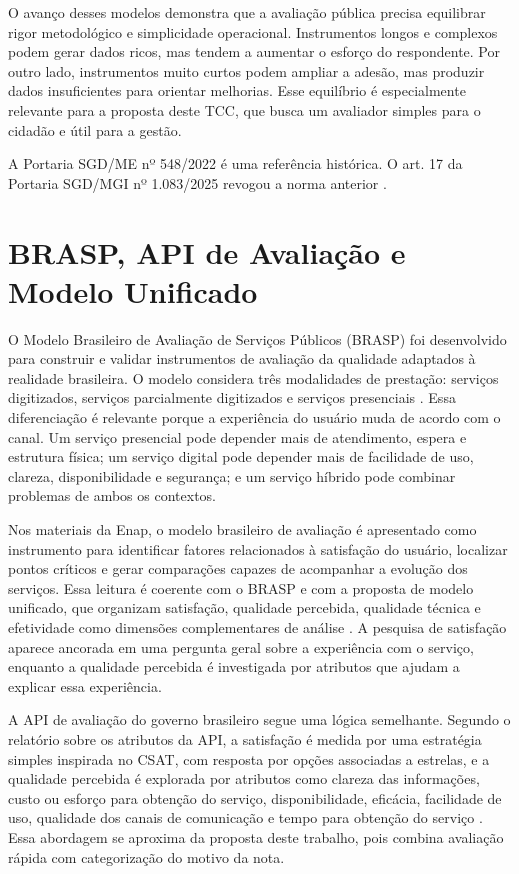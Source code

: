 O avanço desses modelos demonstra que a avaliação pública precisa equilibrar rigor metodológico e simplicidade operacional. Instrumentos longos e complexos podem gerar dados ricos, mas tendem a aumentar o esforço do respondente. Por outro lado, instrumentos muito curtos podem ampliar a adesão, mas produzir dados insuficientes para orientar melhorias. Esse equilíbrio é especialmente relevante para a proposta deste TCC, que busca um avaliador simples para o cidadão e útil para a gestão.

A Portaria SGD/ME nº 548/2022 é uma referência histórica. O art. 17 da Portaria SGD/MGI nº 1.083/2025 revogou a norma anterior \cite{sgd2025}.

\section{BRASP, API de Avaliação e Modelo Unificado}
\label{sec:2.6}

O Modelo Brasileiro de Avaliação de Serviços Públicos (BRASP) foi desenvolvido para construir e validar instrumentos de avaliação da qualidade adaptados à realidade brasileira. O modelo considera três modalidades de prestação: serviços digitizados, serviços parcialmente digitizados e serviços presenciais \cite{silva2019}. Essa diferenciação é relevante porque a experiência do usuário muda de acordo com o canal. Um serviço presencial pode depender mais de atendimento, espera e estrutura física; um serviço digital pode depender mais de facilidade de uso, clareza, disponibilidade e segurança; e um serviço híbrido pode combinar problemas de ambos os contextos.

Nos materiais da Enap, o modelo brasileiro de avaliação é apresentado como instrumento para identificar fatores relacionados à satisfação do usuário, localizar pontos críticos e gerar comparações capazes de acompanhar a evolução dos serviços. Essa leitura é coerente com o BRASP e com a proposta de modelo unificado, que organizam satisfação, qualidade percebida, qualidade técnica e efetividade como dimensões complementares de análise \cite{lima2020m3,silva2019,silva2022}. A pesquisa de satisfação aparece ancorada em uma pergunta geral sobre a experiência com o serviço, enquanto a qualidade percebida é investigada por atributos que ajudam a explicar essa experiência.

A API de avaliação do governo brasileiro segue uma lógica semelhante. Segundo o relatório sobre os atributos da API, a satisfação é medida por uma estratégia simples inspirada no CSAT, com resposta por opções associadas a estrelas, e a qualidade percebida é explorada por atributos como clareza das informações, custo ou esforço para obtenção do serviço, disponibilidade, eficácia, facilidade de uso, qualidade dos canais de comunicação e tempo para obtenção do serviço \cite{silva2024}. Essa abordagem se aproxima da proposta deste trabalho, pois combina avaliação rápida com categorização do motivo da nota.

